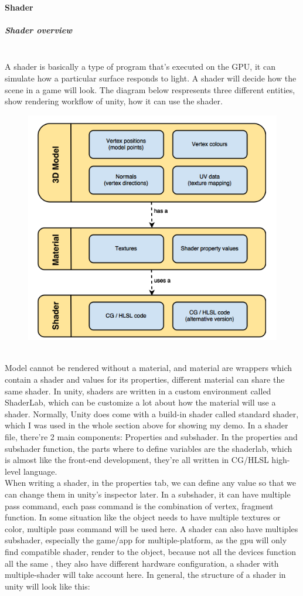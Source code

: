 \documentclass[a4paper, 13pt]{extarticle}
\begin{document}
{ \paragraph{Shader} \vspace{-0.2cm}
 \subparagraph{Shader overview} ~\\[0.1cm]
 A shader is basically a type of program that's executed on the GPU, it can simulate how a particular surface responds to light. A shader will decide how the scene in a game will look. The diagram below respresents three different entities, show rendering workflow of unity, how it can use the shader. 
 \begin{figure}[h]
 		\begin{minipage}{1\textwidth}
 			\centering
 			\includegraphics[width=0.45\linewidth]{intructions/Shader_workflow.png}
 			\centering
 		\end{minipage}
 \end{figure}
\\[0.01cm]
   Model cannot be rendered without a material, and material are wrappers which contain a shader and values for its properties, different material can share the same shader. In unity, shaders are written in a custom environment called ShaderLab, which can be customize a lot about how the material will use a shader. Normally, Unity does come with a build-in shader called standard shader, which I was used in the whole section above for showing my demo. In a shader file, there're 2 main components: Properties and subshader. In the properties and subshader function, the parts where to define variables are the shaderlab, which is almost like the front-end development, they're all written in CG/HLSL high-level language. \\
   When writing a shader, in the properties tab, we can define any value  so that we can change them in unity's inspector later. In a subshader, it can have multiple pass command, each pass command is the combination of vertex, fragment function. In some situation like the object needs to have multiple textures or color, multiple pass command will be used here. A shader can also have multiples subshader, especially the game/app for multiple-platform, as the gpu will only find compatible shader, render to the object, because not all the devices function all the same , they also have different hardware configuration, a shader with multiple-shader will take account here. In general, the structure of a shader in unity will look like this: 
}
\end{document}

